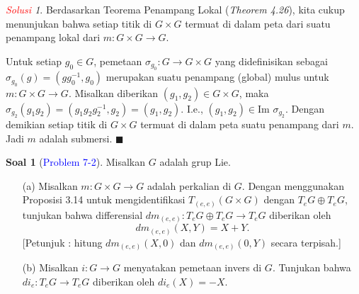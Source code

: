 \documentclass[11pt]{article}
\theoremstyle{definition}
\newtheorem*{problem}{Soal}
\theoremstyle{remark}
\newtheorem*{solution}{\textcolor{red}{Solusi}}
\begin{document}
\begin{solution}
Berdasarkan Teorema Penampang Lokal (\textit{Theorem 4.26}), kita cukup menunjukan bahwa setiap titik di $G \times G$ termuat di dalam peta dari suatu penampang lokal dari $m : G \times G \to G$. \newline

\noindent{}\newline

Untuk setiap $g_0 \in G$, pemetaan $\sigma_{g_0} : G \to G \times G$ yang didefinisikan sebagai $\sigma_{g_0}(g) = (gg_0^{-1},g_0)$ merupakan suatu penampang (global) mulus untuk $m : G \times G \to G$. Misalkan diberikan $(g_1,g_2) \in G\times G$, maka $\sigma_{g_2} (g_1g_2) =(g_1g_2g_2^{-1},g_2)=(g_1,g_2)$. I.e., $(g_1,g_2) \in \text{Im }\sigma_{g_2}$. Dengan demikian setiap titik di $G \times G$ termuat di dalam peta suatu penampang dari $m$. Jadi $m$ adalah submersi. $\blacksquare$
\end{solution}


\begin{problem}[\textcolor{blue}{Problem 7-2}]
Misalkan $G$ adalah grup Lie. 
\begin{itemize}
    \item [(a)] Misalkan $m : G \times G \to G$ adalah perkalian di $G$.  Dengan menggunakan Proposisi 3.14 untuk mengidentifikasi $T_{(e,e)}(G \times G)$ dengan $T_eG \oplus T_eG$, tunjukan bahwa differensial $dm_{(e,e)} : T_eG \oplus T_eG \to T_eG$ diberikan oleh 
    $$
    dm_{(e,e)}(X,Y) = X+Y.
    $$
    [Petunjuk : hitung $dm_{(e,e)}(X,0)$ dan $dm_{(e,e)}(0,Y)$ secara terpisah.]
    
    \item [(b)] Misalkan $i : G \to G$ menyatakan pemetaan invers di $G$. Tunjukan bahwa $di_e : T_eG \to T_eG$ diberikan oleh $di_e(X) = -X$.
\end{itemize}
\end{problem}
\end{document}
